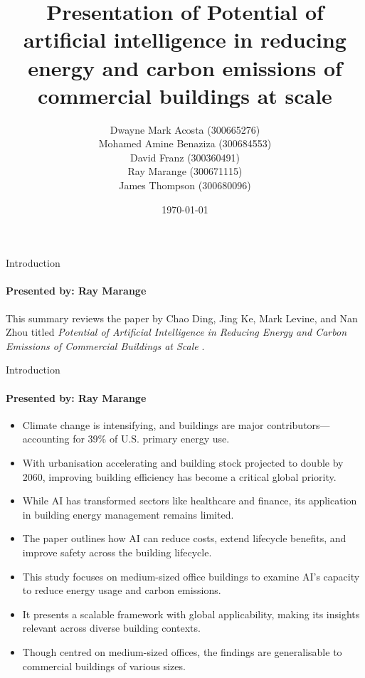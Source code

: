 \documentclass{beamer}
\title{Presentation of Potential of artificial intelligence in reducing energy and carbon emissions of commercial buildings at scale}
\author{Dwayne Mark Acosta (300665276) \\ Mohamed Amine Benaziza (300684553) \\ David Franz (300360491) \\ Ray Marange (300671115) \\ James Thompson (300680096)}
\date{\today}
\begin{document}
\frame{\titlepage}

\begin{frame}{Introduction}
\framesubtitle{Presented by: Ray Marange}

This summary reviews the paper by Chao Ding, Jing Ke, Mark Levine, and Nan Zhou titled \textit{Potential of Artificial Intelligence in Reducing Energy and Carbon Emissions of Commercial Buildings at Scale} \cite{dingPotentialArtificialIntelligence2024}.


\end{frame}

\begin{frame}{Introduction}
\framesubtitle{Presented by: Ray Marange}

\begin{itemize}
    \item Climate change is intensifying, and buildings are major contributors—accounting for 39\% of U.S. primary energy use.
    \item With urbanisation accelerating and building stock projected to double by 2060, improving building efficiency has become a critical global priority.
    \item While AI has transformed sectors like healthcare and finance, its application in building energy management remains limited.
    \item The paper outlines how AI can reduce costs, extend lifecycle benefits, and improve safety across the building lifecycle.
    \item This study focuses on medium-sized office buildings to examine AI’s capacity to reduce energy usage and carbon emissions.
    \item It presents a scalable framework with global applicability, making its insights relevant across diverse building contexts.
    \item Though centred on medium-sized offices, the findings are generalisable to commercial buildings of various sizes.
\end{itemize}

\end{frame}
\end{document}
